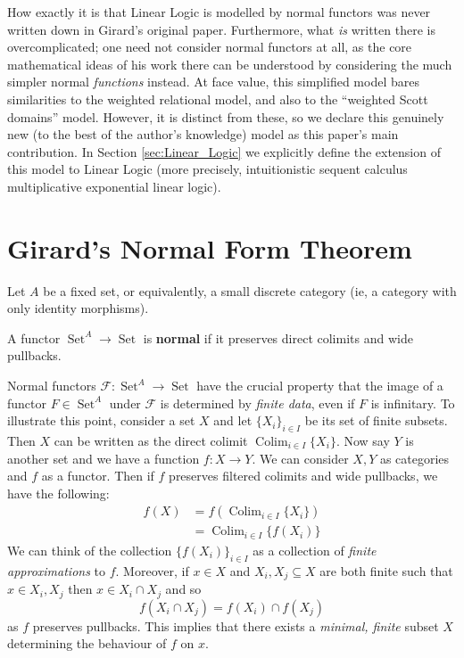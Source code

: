 \documentclass[runningheads]{llncs}
\newcommand{\scr}[1]{\mathscr{#1}}
\newcommand{\lto}{\longrightarrow}
\DeclareMathOperator{\set}{Set}
\begin{document}
How exactly it is that Linear Logic is modelled by normal functors was never written down in Girard's original paper. Furthermore, what \textit{is} written there is overcomplicated; one need not consider normal functors at all, as the core mathematical ideas of his work there can be understood by considering the much simpler normal \textit{functions} instead. At face value, this simplified model bares similarities to the weighted relational model, and also to the ``weighted Scott domains'' model. However, it is distinct from these, so we declare this genuinely new (to the best of the author's knowledge) model as this paper's main contribution. In Section \ref{sec:Linear_Logic} we explicitly define the extension of this model to Linear Logic (more precisely, intuitionistic sequent calculus multiplicative exponential linear logic).

\section{Girard's Normal Form Theorem}\label{sec:NFT}
Let $A$ be a fixed set, or equivalently, a small discrete category (ie, a category with only identity morphisms).
\begin{definition}\label{def:normal_functor}
		A functor $\set^A \lto \set$ is \textbf{normal} if it preserves direct colimits and wide pullbacks.
		\end{definition}
Normal functors $\scr{F}: \set^A \lto \set$ have the crucial property that the image of a functor $F \in \set^A$ under $\scr{F}$ is determined by \emph{finite data}, even if $F$ is infinitary. To illustrate this point, consider a set $X$ and let $\{ X_i \}_{i \in I}$ be its set of finite subsets. Then $X$ can be written as the direct colimit $\operatorname{Colim}_{i \in I}\{ X_i \}$. Now say $Y$ is another set and we have a function $f: X \lto Y$. We can consider $X,Y$ as categories and $f$ as a functor. Then if $f$ preserves filtered colimits and wide pullbacks, we have the following:
\begin{align*}
    f(X) &= f(\operatorname{Colim}_{i \in I}\{ X_i \})\\
    &= \operatorname{Colim}_{i \in I}\{ f(X_i) \} 
\end{align*}
We can think of the collection $\{ f(X_i) \}_{i \in I}$ as a collection of \emph{finite approximations} to $f$. Moreover, if $x \in X$ and $X_i, X_j \subseteq X$ are both finite such that $x \in X_i, X_j$ then $x \in X_i \cap X_j$ and so
\begin{equation}
f(X_i \cap X_j) = f(X_i) \cap f(X_j)
\end{equation}
as $f$ preserves pullbacks. This implies that there exists a \emph{minimal, finite} subset $X$ determining the behaviour of $f$ on $x$.
\end{document}
